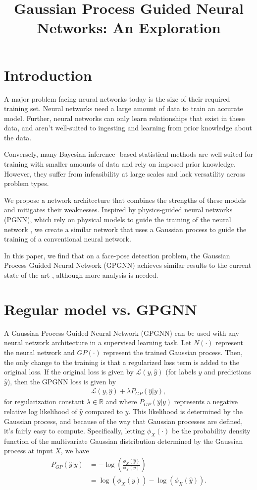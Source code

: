 \documentclass[11pt,letterpaper]{article}
\title{Gaussian Process Guided Neural Networks: An Exploration}
\author{\name}
\begin{document}
\maketitle

\section{Introduction}
  A major problem facing neural networks today is the size of their required training set. Neural networks need a large amount of data to train an accurate model. Further, neural networks can only learn relationships that exist in these data, and aren't well-suited to ingesting and learning from prior knowledge about the data.

  Conversely, many Bayesian inference- based statistical methods are well-suited for training with smaller amounts of data and rely on imposed prior knowledge. However, they suffer from infeasibility at large scales and lack versatility across problem types.

  We propose a network architecture that combines the strengths of these models and mitigates their weaknesses.
  Inspired by physics-guided neural networks (PGNN), which rely on physical models to guide the training of the neural network \cite{PGNN}, we create a similar network that uses a Gaussian process to guide the training of a conventional neural network.

  In this paper, we find that on a face-pose detection problem, the Gaussian Process Guided Neural Network (GPGNN) achieves similar results to the current state-of-the-art \cite{whenet}, although more analysis is needed.

\section{Regular model vs. GPGNN}
A Gaussian Process-Guided Neural Network (GPGNN) can be used with any neural network architecture in a supervised learning task.
Let $ N(\cdot) $ represent the neural network and $ GP(\cdot) $ represent the trained Gaussian process.
Then, the only change to the training is that a regularized loss term is added to the original loss.
If the original loss is given by $ \mathscr{L}(y, \hat{y}) $ (for labels $ y $ and predictions $ \hat{y} $), then the GPGNN loss is given by \begin{align*}
    \mathscr{L}(y, \hat{y}) + \lambda P_{GP}(\hat{y} | y),
\end{align*}
for regularization constant $ \lambda \in \mathbb{R} $ and where $ P_{GP}(\hat{y} | y) $ represents a negative relative log likelihood of $ \hat{y} $ compared to $y$.
This likelihood is determined by the Gaussian process, and because of the way that Gaussian processes are defined, it's fairly easy to compute.
Specifically, letting $ \phi_X(\cdot) $ be the probability density function of the multivariate Gaussian distribution determined by the Gaussian process at input $ X $, we have \begin{align*}
     P_{GP}(\hat{y} | y) &= -\log \left( \frac{\phi_X(\hat{y})}{\phi_X(y)} \right) \\
     &= \log(\phi_X(y)) - \log(\phi_X(\hat{y})).
\end{align*}
\end{document}
